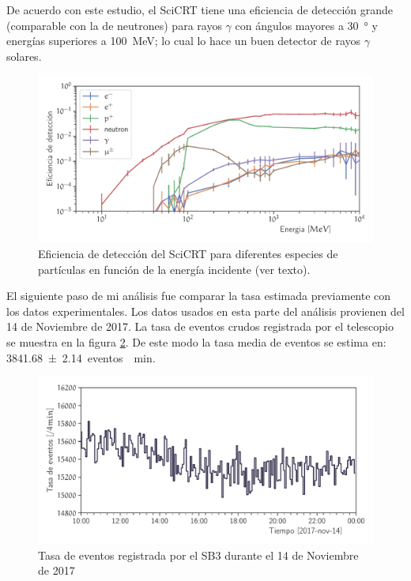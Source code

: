 De acuerdo con este estudio, el SciCRT tiene una eficiencia de detección grande (comparable con la de neutrones) para rayos $\gamma$ con ángulos mayores a \SI{30}{\degree} y energías superiores a \SI{100}{\mega\electronvolt}; lo cual lo hace un buen detector de rayos $\gamma$ solares.

\begin{figure}
        \centering
        \includegraphics[width=\textwidth]{scibar-efficiency.pdf}
        \caption{Eficiencia de detección del SciCRT para diferentes especies de partículas en función de la energía incidente (ver texto).}
        \label{fig:total-efficiency}
\end{figure}

El siguiente paso de mi análisis fue comparar la tasa estimada previamente con los datos experimentales. Los datos usados en esta parte del análisis provienen del \num{14} de Noviembre de \num{2017}. La tasa de eventos crudos registrada por el telescopio se muestra en la figura \ref{fig:neutron-1pix}. De este modo la tasa media de eventos se estima en: \SI{3841.68(214)}{eventos \per\minute}.

\begin{figure}
        \centering
        \includegraphics[width=\textwidth]{neutron-171114-1pix.pdf}
        \caption{Tasa de eventos registrada por el SB3 durante el \num{14} de Noviembre de \num{2017}}
        \label{fig:neutron-1pix}
\end{figure}

